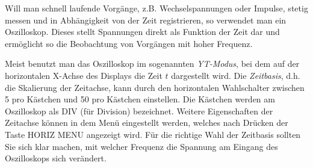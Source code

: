 %

Will man schnell laufende Vorgänge, z.B. Wechselspannungen oder Impulse, stetig messen und in Abhängigkeit von der Zeit registrieren, so verwendet man ein Oszilloskop. Dieses stellt Spannungen direkt als Funktion der Zeit dar und ermöglicht so die Beobachtung von Vorgängen mit hoher Frequenz.

  Meist benutzt man das Oszilloskop im sogenannten \textit{YT-Modus}, bei dem auf der horizontalen X-Achse des Displays die Zeit $t$ dargestellt wird. Die \textit{Zeitbasis}, d.h. die Skalierung der Zeitachse, kann durch den horizontalen Wahlschalter zwischen \unit{5}{\nano\second} pro Kästchen und \unit{50}{\second} pro Kästchen einstellen. 
  Die K\"astchen werden am Oszilloskop als DIV (f\"ur Division) bezeichnet. 
  Weitere Eigenschaften der Zeitachse können in dem Menü eingestellt werden, welches nach Drücken der 
  Taste HORIZ MENU angezeigt wird. Für die richtige Wahl der Zeitbasis sollten Sie sich klar machen, mit welcher Frequenz die Spannung am Eingang des Oszilloskops sich verändert.

